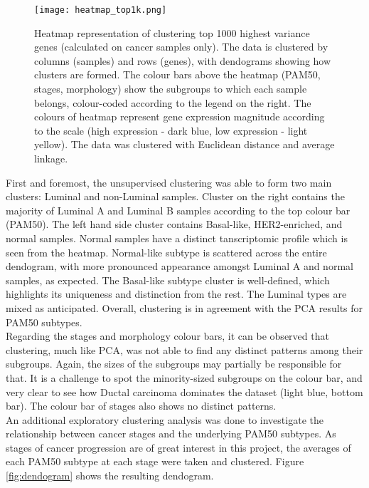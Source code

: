             \begin{figure}[!h]
            \centering
            \texttt{[image: heatmap\_top1k.png]}
            \caption[Heatmap clustering of top genes with highest variance]{Heatmap representation of clustering top 1000 highest variance genes (calculated on cancer samples only). The data is clustered by columns (samples) and rows (genes), with dendograms showing how clusters are formed. The colour bars above the heatmap (PAM50, stages, morphology) show the subgroups to which each sample belongs, colour-coded according to the legend on the right. The colours of heatmap represent gene expression magnitude according to the scale (high expression - dark blue, low expression - light yellow). The data was clustered with Euclidean distance and average linkage. }
            \label{fig:heatmap1k}
            \end{figure}
    \newpage
    First and foremost, the unsupervised clustering was able to form two main clusters: Luminal and non-Luminal samples. Cluster on the right contains the majority of Luminal A and Luminal B samples according to the top colour bar (PAM50). The left hand side cluster contains Basal-like, HER2-enriched, and normal samples. Normal samples have a distinct tanscriptomic profile which is seen from the heatmap. Normal-like subtype is scattered across the entire dendogram, with more pronounced appearance amongst Luminal A and normal samples, as expected. The Basal-like subtype cluster is well-defined, which highlights its uniqueness and distinction from the rest. The Luminal types are mixed as anticipated. Overall, clustering is in agreement with the PCA results for PAM50 subtypes. \\    
    Regarding the stages and morphology colour bars, it can be observed that clustering, much like PCA, was not able to find any distinct patterns among their subgroups. Again, the sizes of the subgroups may partially be responsible for that. It is a challenge to spot the minority-sized subgroups on the colour bar, and very clear to see how Ductal carcinoma dominates the dataset (light blue, bottom bar). The colour bar of stages also shows no distinct patterns. \\
    
    An additional exploratory clustering analysis was done to investigate the relationship between cancer stages and the underlying PAM50 subtypes. As stages of cancer progression are of great interest in this project, the averages of each PAM50 subtype at each stage were taken and clustered. Figure \ref{fig:dendogram} shows the resulting dendogram. 
    
